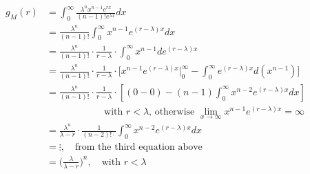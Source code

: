 \documentclass[UTF8]{article}
\begin{document}
\begin{enumerate}
            \begin{equation*}
                \begin{split}
                    g_M(r) &=\int^\infty_{0}\frac{\lambda^nx^{n-1}e^{rx}}{(n-1)!e^{\lambda x}}dx\\
                    &=\frac{\lambda^n}{(n-1)!}\int^\infty_0x^{n-1}e^{(r-\lambda)x}dx\\
                    &=\frac{\lambda^n}{(n-1)!}\cdot\frac{1}{r-\lambda}\cdot\int^\infty_0x^{n-1}de^{(r-\lambda)x}\\
                    &=\frac{\lambda^n}{(n-1)!}\cdot\frac{1}{r-\lambda}\cdot\bigg[x^{n-1}e^{(r-\lambda)x}\bigg|^\infty_0-\int^\infty_0e^{(r-\lambda)x}d(x^{n-1})\bigg]\\
                    &=\frac{\lambda^n}{(n-1)!}\cdot\frac{1}{r-\lambda}\cdot[(0-0)-(n-1)\int^\infty_0x^{n-2}e^{(r-\lambda)x}dx]\\
                    & \qquad\qquad\qquad\text{with $r<\lambda$, otherwise $\lim_{x\rightarrow\infty}x^{n-1}e^{(r-\lambda)x}=\infty$}\\\
                    &= \frac{\lambda^n}{\lambda-r}\cdot\frac{1}{(n-2)!\cdot}\int^\infty_0x^{n-2}e^{(r-\lambda)x}dx\\
                    &=\vdots,\quad\text{from the third equation above}\\
                    &=\bigg(\frac{\lambda}{\lambda-r}\bigg)^n,\quad\text{with $r<\lambda$}
                \end{split}
            \end{equation*}


\end{enumerate}
\end{document}
